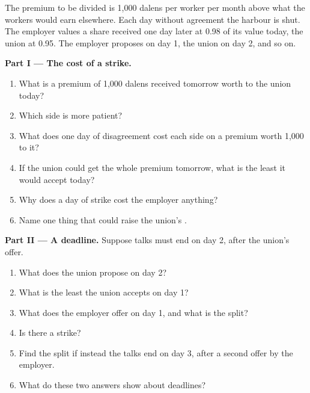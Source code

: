 \begin{problem}
\label{pb:b2:dynamic-games:1}
The premium to be divided is 1{,}000 dalens per worker per month above what the workers would earn elsewhere.
Each day without agreement the harbour is shut. The employer values a share received one day later at 0.98 of its
value today, the union at 0.95. The employer proposes on day 1, the union on day 2, and so on.

\medskip
\noindent\textbf{Part I --- The cost of a strike.}
\begin{enumerate}
  \item What is a premium of 1{,}000 dalens received tomorrow worth to the union today?
  \item Which side is more patient?
  \item What does one day of disagreement cost each side on a premium worth 1{,}000 to it?
  \item If the union could get the whole premium tomorrow, what is the least it would accept today?
  \item Why does a day of strike cost the employer anything?
  \item Name one thing that could raise the union's .
\end{enumerate}

\medskip
\noindent\textbf{Part II --- A deadline.} Suppose talks must end on day 2, after the union's offer.
\begin{enumerate}[resume]
  \item What does the union propose on day 2?
  \item What is the least the union accepts on day 1?
  \item What does the employer offer on day 1, and what is the split?
  \item Is there a strike?
  \item Find the split if instead the talks end on day 3, after a second offer by the employer.
  \item What do these two answers show about deadlines?
\end{enumerate}


\end{problem}
